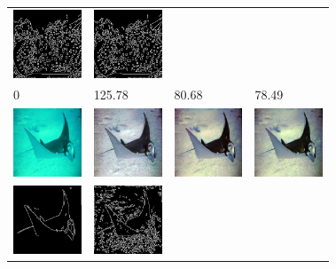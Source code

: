 \documentclass[conference,reqno]{IEEEtran}
\begin{document}
\begin{figure}
\begin{tabular}{p{1.7cm} p{1.7cm} p{1.7cm} p{1.5cm}}
   \includegraphics[width=0.8in]{n01496331_15872_u0edges}  &
   \includegraphics[width=0.8in]{n01496331_15872_u1edges}  \\
   0 & \small{125.78} & \small{80.68} & \small{78.49} \\

   \includegraphics[width=0.8in]{n01496331_22079_original} &
   \includegraphics[width=0.8in]{n01496331_22079_cimg}     & 
   \includegraphics[width=0.8in]{n01496331_22079_u0img}    &
   \includegraphics[width=0.8in]{n01496331_22079_u1img}    \\ [-1ex]
   \includegraphics[width=0.8in]{n01496331_22079_oedges}   &
   \includegraphics[width=0.8in]{n01496331_22079_cedges}   &

\end{tabular}
\end{figure}
\end{document}
